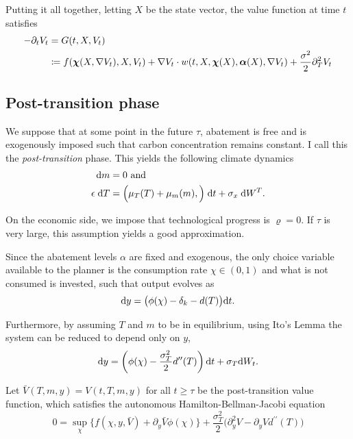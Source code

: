 \documentclass[../../main.tex]{subfiles}
\begin{document}
Putting it all together, letting $X$ be the state vector, the value function at time $t$ satisfies \begin{equation}
    \begin{split}
        -\partial_t V_t &= G(t, X, V_t) \\
        &\coloneqq f(\bm{\chi}(X, \nabla V_t), X, V_t) + \nabla V_t \cdot w(t, X, \bm{\chi}(X), \bm{\alpha}(X),  \nabla V_t) + \frac{\sigma^2}{2} \partial_{T}^2 V_t
    \end{split}
\end{equation}


\subsection{Post-transition phase}

We suppose that at some point in the future $\tau$, abatement is free and is exogenously imposed such that carbon concentration remains constant. I call this the \textit{post-transition} phase. This yields the following climate dynamics \begin{align}
    \mathrm{d}m &= 0 \text{ and } \\
    \epsilon \; \mathrm{d}T &= \Big(\mu_T(T) + \mu_m(m),\Big) \; \mathrm{d}t + \sigma_x \; \mathrm{d}W^T.
\end{align}

On the economic side, we impose that technological progress is $\varrho = 0$. If $\tau$ is very large, this assumption yields a good approximation. 

Since the abatement levels $\alpha$ are fixed and exogenous, the only choice variable available to the planner is the consumption rate $\chi \in (0, 1)$ and what is not consumed is invested, such that output evolves as \begin{equation}
    \mathrm{d}y = \big(\phi(\chi) - \delta_k - d(T) \big) \mathrm{d}t.
\end{equation}

Furthermore, by assuming $T$ and $m$ to be in equilibrium, using Ito's Lemma the system can be reduced to depend only on $y$, \begin{equation}
    \mathrm{d}y = \left(\phi(\chi) - \frac{\sigma^2_T}{2} d^{\prime\prime}(T) \right) \mathrm{d}t + \sigma_T \mathrm{d}W_t.
\end{equation}

Let $\bar{V}(T, m, y) = V(t, T, m, y)$ for all $t \geq \tau$ be the post-transition value function, which satisfies the autonomous Hamilton-Bellman-Jacobi equation \begin{equation}
    0 = \sup_{\chi} \big\{f(\chi, y, \bar{V}) +  \partial_y \bar{V} \phi(\chi) \big\} +  \frac{\sigma_T^2}{2} \Big( \partial^2_y V - \partial_y V d^{\prime \prime}(T) \Big)
\end{equation}
\end{document}
